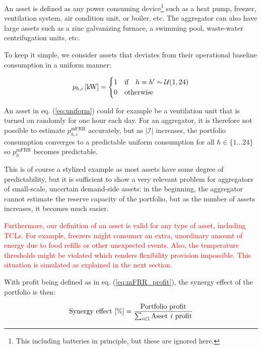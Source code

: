 \documentclass[lettersize,journal]{IEEEtran}
\newcommand{\red}[1]{\textcolor{red}{#1}}
\begin{document}
An asset is defined as any power consuming device\footnote{This including batteries in principle, but these are ignored here.} such as a heat pump, freezer, ventilation system, air condition unit, or boiler, etc. The aggregator can also have large assets such as a zinc galvanizing furnace, a swimming pool, waste-water centrifugation units, etc.

To keep it simple, we consider assets that deviates from their operational baseline consumption in a uniform manner:

\begin{align}\label{eq:uniform}
    p_{h,i} \thinspace [\text{kW}] = \begin{cases}
                                         1 & \text{if} \quad h = h^{\prime} \sim \mathcal{U}(1,24) \\
                                         0 & \text{otherwise}
                                     \end{cases}
\end{align}

An asset in eq. (\ref{eq:uniform}) could for example be a ventilation unit that is turned on randomly for one hour each day. For an aggregator, it is therefore not possible to estimate $p^{\text{mFRR}}_{h, i}$ accurately, but as $|\mathcal{I}|$ increases, the portfolio consumption converges to a predictable uniform consumption for all $h \in \{1 \hdots 24 \}$ so $p^{\text{mFRR}}_{h}$ becomes predictable.


This is of course a stylized example as most assets have some degree of predictability, but it is sufficient to show a very relevant problem for aggregators of small-scale, uncertain demand-side assets: in the beginning, the aggregator cannot estimate the reserve capacity of the portfolio, but as the number of assets increases, it becomes much easier.

\red{Furthermore, our definition of an asset is valid for any type of asset, including TCLs. For example, freezers might consumer an extra, unordinary amount of energy due to food refills or other unexpected events. Also, the temperature thresholds might be violated which renders flexibility provision impossible. This situation is simulated as explained in the next section.}

With profit being defined as in eq. (\ref{eq:mFRR_profit}), the synergy effect of the portfolio is then:

\begin{align}\label{eq:synergy_effect}
    \text{Synergy effect [\%]} = \frac{ \text{Portfolio profit} }{ \sum_{i \in \mathbb{I}} \text{Asset \textit{i} profit} }
\end{align}
\end{document}
